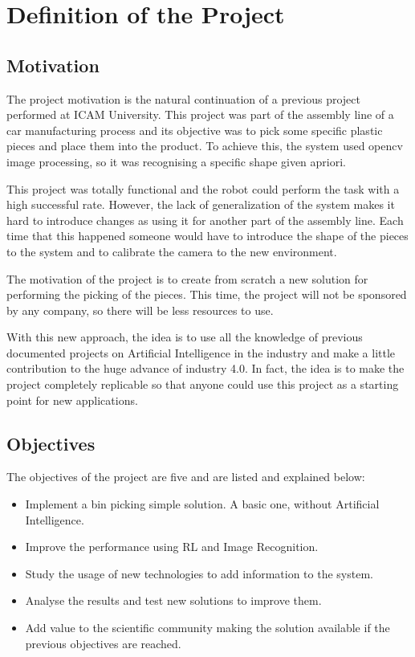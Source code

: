 \chapter{Definition of the Project}

	\section{Motivation}
		The project motivation is the natural continuation of a previous project performed at ICAM University. This project was part of the assembly line of a car manufacturing process and its objective was to pick some specific plastic pieces and place them into the product. To achieve this, the system used opencv image processing, so it was recognising a specific shape given apriori.
		
		This project was totally functional and the robot could perform the task with a high successful rate. However, the lack of generalization of the system makes it hard to introduce changes as using it for another part of the assembly line. Each time that this happened someone would have to introduce the shape of the pieces to the system and to calibrate the camera to the new environment. 
		
		The motivation of the project is to create from scratch a new solution for performing the picking of the pieces. This time, the project will not be sponsored by any company, so there will be less resources to use.
		
		With this new approach, the idea is to use all the knowledge of previous documented projects on Artificial Intelligence in the industry and make a little contribution to the huge advance of industry 4.0. In fact, the idea is to make the project completely replicable so that anyone could use this project as a starting point for new applications.

	\section{Objectives}

		The objectives of the project are five and are listed and explained below:
		
		\begin{itemize}
			\item[\textendash]Implement a bin picking simple solution. A basic one, without Artificial Intelligence.
			\item[\textendash]Improve the performance using RL and Image Recognition.
			\item[\textendash]Study the usage of new technologies to add information to the system. 
			\item[\textendash]Analyse the results and test new solutions to improve them. 
			\item[\textendash]Add value to the scientific community making the solution available if the previous objectives are reached.
		\end{itemize}
	
